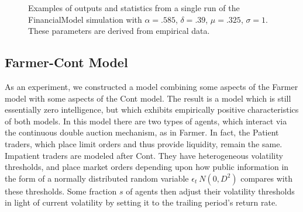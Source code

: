 \documentclass[runningheads]{llncs}
\begin{document}
\begin{figure}[htbp]
\begin{center}
{
      }
    \caption{Examples of outputs and statistics from a single run of the FinancialModel simulation with $\alpha=.585$, $\delta=.39$, $\mu=.325$, $\sigma=1$. These parameters are derived from empirical data.}
    \label{fig:dynamicsFarmerNonLog}
  \end{center}
\end{figure}


\subsection{Farmer-Cont Model}

As an experiment, we constructed a model combining some aspects of the Farmer model with some aspects of the Cont model. The result is a model which is still essentially zero intelligence, but which exhibits empirically positive characteristics of both models. In this model there are two types of agents, which interact via the continuous double auction mechanism, as in Farmer. In fact, the Patient traders, which place limit orders and thus provide liquidity, remain the same. Impatient traders are modeled after Cont. They have heterogeneous volatility thresholds, and place market orders depending upon how public information in the form of a normally distributed random variable $\epsilon_t ~ N(0,D^2)$ compares with these thresholds. Some fraction $s$ of agents then adjust their volatility thresholds in light of current volatility by setting it to the trailing period's return rate.
\end{document}
